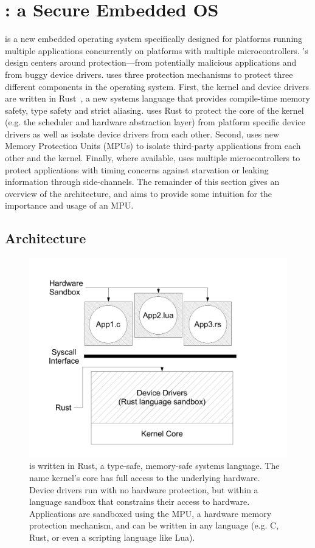 \section{\name: a Secure Embedded OS}
\label{sec:os}

\name is a new embedded operating system specifically designed for platforms
running multiple applications concurrently on platforms with multiple
microcontrollers. \name's design centers around protection---from potentially
malicious applications and from buggy device drivers. \name uses three
protection mechanisms to protect three different components in the operating
system. First, the kernel and device drivers are written in Rust~\cite{rust}, a
new systems language that provides compile-time memory safety, type safety and
strict aliasing. \name uses Rust to protect the core of the kernel (e.g. the
scheduler and hardware abstraction layer) from platform specific device drivers
as well as isolate device drivers from each other. Second, \name uses new Memory
Protection Units (MPUs) to isolate third-party applications from each other and
the kernel. Finally, where available, \name uses multiple microcontrollers to
protect applications with timing concerns against starvation or leaking
information through side-channels. The remainder of this section gives an
overview of the \name architecture, and aims to provide some intuition for the
importance and usage of an MPU.

\subsection{Architecture}
\label{sec:os-arch}

\begin{figure}
 \centering
\includegraphics[width=1\columnwidth]{img/architecture}
\caption{\name is written in Rust, a type-safe, memory-safe systems language.
The name kernel's core has full access to the underlying hardware. Device
drivers run with no hardware protection, but within a language sandbox that
constrains their access to hardware. Applications are sandboxed using the MPU, a
hardware memory protection mechanism, and can be written in any language (e.g.
C, Rust, or even a scripting language like Lua).}
\label{fig:architecture}
\end{figure}

